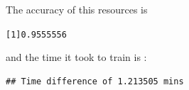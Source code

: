 \documentclass[letter,8pt]{article}\usepackage[]{graphicx}\usepackage[]{color}
\makeatletter
\newenvironment{kframe}{%
 \def\at@end@of@kframe{}%
 \ifinner\ifhmode%
  \def\at@end@of@kframe{\end{minipage}}%
  \begin{minipage}{\columnwidth}%
 \fi\fi%
 \def\FrameCommand##1{\hskip\@totalleftmargin \hskip-\fboxsep
 \colorbox{shadecolor}{##1}\hskip-\fboxsep
     \hskip-\linewidth \hskip-\@totalleftmargin \hskip\columnwidth}%
 \MakeFramed {\advance\hsize-\width
   \@totalleftmargin\z@ \linewidth\hsize
   \@setminipage}}%
 {\par\unskip\endMakeFramed%
 \at@end@of@kframe}
\newenvironment{knitrout}{}{} %
\makeatother
\begin{document}
The accuracy of this resources is
\begin{knitrout}
\color{fgcolor}\begin{kframe}
\begin{alltt}
[1] 0.9555556
\end{alltt}
\end{kframe}
\end{knitrout}
and the time it took to train is :
\begin{knitrout}
\color{fgcolor}\begin{kframe}
\begin{verbatim}
## Time difference of 1.213505 mins
\end{verbatim}
\end{kframe}
\end{knitrout}
\end{document}
